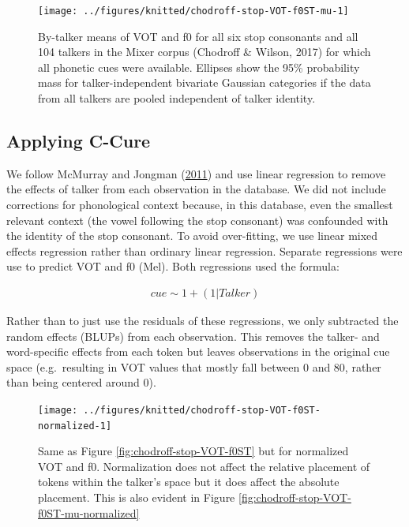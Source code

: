 \documentclass[
  11pt,
  man,floatsintext]{apa6}
\begin{document}
\begin{figure}

{\centering \texttt{[image: ../figures/knitted/chodroff-stop-VOT-f0ST-mu-1]} 

}

\caption{By-talker means of VOT and f0 for all six stop consonants and all 104 talkers in the Mixer corpus (Chodroff \& Wilson, 2017) for which all phonetic cues were available. Ellipses show the 95\% probability mass for talker-independent bivariate Gaussian categories if the data from all talkers are pooled independent of talker identity.}\label{fig:chodroff-stop-VOT-f0ST-mu}
\end{figure}

\hypertarget{applying-c-cure}{%
\subsection{Applying C-Cure}\label{applying-c-cure}}

We follow McMurray and Jongman (\protect\hyperlink{ref-mcmurray-jongman2011}{2011}) and use linear regression to remove the effects of talker from each observation in the database. We did not include corrections for phonological context because, in this database, even the smallest relevant context (the vowel following the stop consonant) was confounded with the identity of the stop consonant. To avoid over-fitting, we use linear mixed effects regression rather than ordinary linear regression. Separate regressions were use to predict VOT and f0 (Mel). Both regressions used the formula:

\begin{equation}\label{eq:c-cure-regression}
\begin{split}
cue \sim 1 + (1 | Talker)
\end{split}
\end{equation}

Rather than to just use the residuals of these regressions, we only subtracted the random effects (BLUPs) from each observation. This removes the talker- and word-specific effects from each token but leaves observations in the original cue space (e.g.~resulting in VOT values that mostly fall between 0 and 80, rather than being centered around 0).



\begin{figure}

{\centering \texttt{[image: ../figures/knitted/chodroff-stop-VOT-f0ST-normalized-1]} 

}

\caption{Same as Figure \ref{fig:chodroff-stop-VOT-f0ST} but for normalized VOT and f0. Normalization does not affect the relative placement of tokens within the talker's space but it does affect the absolute placement. This is also evident in Figure \ref{fig:chodroff-stop-VOT-f0ST-mu-normalized}}\label{fig:chodroff-stop-VOT-f0ST-normalized}
\end{figure}
\end{document}
